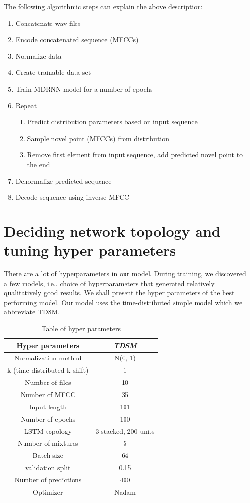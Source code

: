 \documentclass[conference]{IEEEtran}
\begin{document}
The following algorithmic steps can explain the above description:
\begin{enumerate}
    \item Concatenate wav-files
    \item Encode concatenated sequence (MFCCs)
    \item Normalize data
    \item Create trainable data set 
    \item Train MDRNN model for a number of epochs
    \item Repeat 
         \begin{enumerate}
        \item Predict distribution parameters based on input sequence
        \item Sample novel point (MFCCs) from distribution
        \item Remove first element from input sequence, add predicted novel point to the end
    \end{enumerate}
    \item Denormalize predicted sequence
    \item Decode sequence using inverse MFCC
\end{enumerate}

\section{Deciding network topology and tuning hyper parameters}
There are a lot of hyperparameters in our model. During training, we discovered a few models, i.e., choice of hyperparameters that generated relatively qualitatively good results. We shall present the hyper parameters of the best performing model. Our model uses the time-distributed simple model which we abbreviate TDSM.

\begin{table}[htbp]
\caption{Table of hyper parameters}
\begin{center}
\begin{tabular}{|c|c|}
\hline
\textbf{Hyper parameters} & \textbf{\textit{TDSM}} \\
\hline
Normalization method & N(0, 1) \\
\hline
k (time-distributed k-shift)& 1 \\
\hline
Number of files & 10 \\
\hline
Number of MFCC & 35 \\
\hline
Input length & 101 \\
\hline
Number of epochs & 100 \\
\hline
LSTM topology & 3-stacked, 200 units \\
\hline
Number of mixtures & 5 \\
\hline
Batch size & 64 \\
\hline
validation split & 0.15 \\
\hline
Number of predictions & 400 \\
\hline
Optimizer & Nadam \\
\hline
\end{tabular}
\label{tab1}
\end{center}
\end{table}
\end{document}
